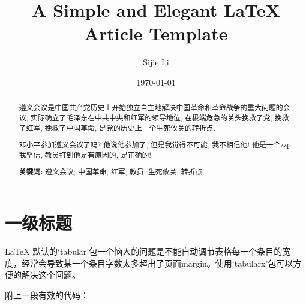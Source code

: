 \documentclass[12pt, a4paper, oneside]{ctexart}
\title{\textbf{A Simple and Elegant \LaTeX{} Article Template}}
\author{Sijie Li}
\affil{School of Economics and Management, Southeast University}
\date{\today}
\begin{document}
%

\maketitle

\setcounter{page}{0}
\thispagestyle{empty}

\begin{abstract}
遵义会议是中国共产党历史上开始独立自主地解决中国革命和革命战争的重大问题的会议, 实际确立了毛泽东在中共中央和红军的领导地位, 在极端危急的关头挽救了党, 挽救了红军, 挽救了中国革命, 是党的历史上一个生死攸关的转折点.

邓小平参加遵义会议了吗? 他说他参加了, 但是我觉得不可能, 我不相信他! 他是一个zzp, 我坚信, 教员打到他是有原因的, 是正确的!

\par\textbf{关键词:} 遵义会议; 中国革命; 红军; 教员; 生死攸关; 转折点. 
\end{abstract}

\newpage
{}
\setcounter{page}{1}
\tableofcontents		%
\newpage
\setcounter{page}{1}


\section{一级标题}
\LaTeX{} 默认的`tabular'包一个恼人的问题是不能自动调节表格每一个条目的宽度，经常会导致某一个条目字数太多超出了页面margin。使用`tabularx'包可以方便的解决这个问题。

附上一段有效的代码：

\end{document}
